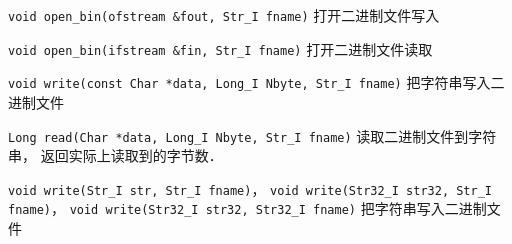 \verb|void open_bin(ofstream &fout, Str_I fname)| 打开二进制文件写入

\verb|void open_bin(ifstream &fin, Str_I fname)| 打开二进制文件读取

\verb|void write(const Char *data, Long_I Nbyte, Str_I fname)| 把字符串写入二进制文件

\verb|Long read(Char *data, Long_I Nbyte, Str_I fname)| 读取二进制文件到字符串， 返回实际上读取到的字节数．

\verb|void write(Str_I str, Str_I fname)|， \verb|void write(Str32_I str32, Str_I fname)|， \verb|void write(Str32_I str32, Str32_I fname)| 把字符串写入二进制文件


